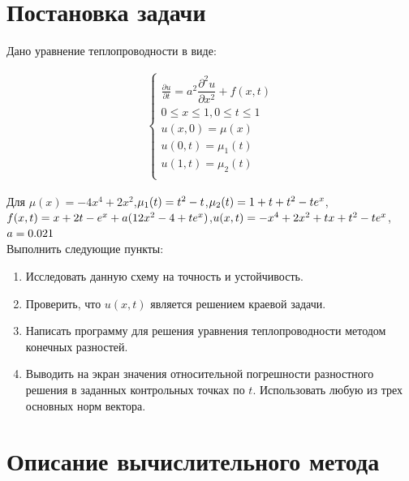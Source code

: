 \documentclass[12pt,a4paper]{scrartcl}
\begin{document}


\newpage
\section{Постановка задачи}

Дано уравнение теплопроводности в виде:

\begin{align}\label{main}
    \begin{cases}
        \frac{\partial u}{\partial t} = a^{2}
        {\dfrac{{\partial}^2 u}{\partial x^{2}}}+f(x,t) \\
        0\le x \le 1, 0\le t \le1 \\
        u(x,0) = \mu(x) \\
        u(0,t) = \mu_1(t) \\
        u(1,t) = \mu_2(t) \\
    \end{cases}
\end{align}

Для $\mu(x) = -4x^{4}+2x^{2}$,$ \\
    \mu_1(t) = t^{2}-t$,$ \\
    \mu_2(t) = 1+t+t^{2}-t e^{x}$,$ \\
    f(x,t) = x+2 t-e^{x}+a(12 x^{2}-4+t e^{x}) $,$\\
    u(x,t) = -x^{4}+2 x^{2}+t x+t^{2}-t e^{x} $,$\\
    a = 0.021 $\\

Выполнить следующие пункты:

\begin{enumerate}
    \item Исследовать данную схему на точность и устойчивость.
    \item Проверить, что $u(x,t)$ является решением краевой задачи.
    \item Написать программу для решения уравнения теплопроводности методом конечных разностей.
    \item Выводить на экран значения относительной погрешности разностного решения в заданных контрольных точках по $t$. Использовать любую из трех основных норм вектора.
\end{enumerate}

\section{Описание вычислительного метода}
\end{document}
